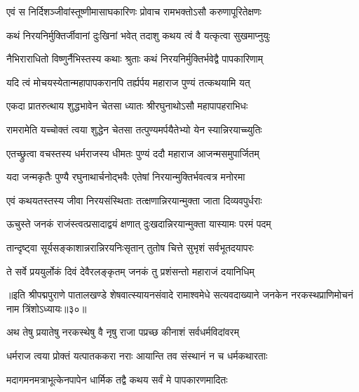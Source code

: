 
\twolineshloka
{एवं स निर्दिशञ्जीवांस्तूष्णीमासाघकारिणः}
{प्रोवाच रामभक्तोऽसौ करुणापूरितेक्षणः}%


\twolineshloka
{कथं निरयनिर्मुक्तिर्जीवानां दुःखिनां भवेत्}
{तदाशु कथय त्वं वै यत्कृत्वा सुखमाप्नुयुः}%


\twolineshloka
{नैभिराराधितो विष्णुर्नैभिस्तस्य कथाः श्रुताः}
{कथं निरयनिर्मुक्तिर्भवेद्वै पापकारिणाम्}%

\twolineshloka
{यदि त्वं मोचयस्येतान्महापापकरानपि}
{तर्ह्यर्पय महाराज पुण्यं तत्कथयामि यत्}%

\twolineshloka
{एकदा प्रातरुत्थाय शुद्धभावेन चेतसा}
{ध्यातः श्रीरघुनाथोऽसौ महापापहराभिधः}%

\twolineshloka
{रामरामेति यच्चोक्तं त्वया शुद्धेन चेतसा}
{तत्पुण्यमर्पयैतेभ्यो येन स्यान्निरयाच्च्युतिः}%


\twolineshloka
{एतच्छ्रुत्वा वचस्तस्य धर्मराजस्य धीमतः}
{पुण्यं ददौ महाराज आजन्मसमुपार्जितम्}%

\twolineshloka
{यदा जन्मकृतैः पुण्यै रघुनाथार्चनोद्भवैः}
{एतेषां निरयान्मुक्तिर्भवत्वत्र मनोरमा}%

\twolineshloka
{एवं कथयतस्तस्य जीवा निरयसंस्थिताः}
{तत्क्षणान्निरयान्मुक्ता जाता दिव्यवपुर्धराः}%

\twolineshloka
{ऊचुस्ते जनकं राजंस्त्वत्प्रसादाद्वयं क्षणात्}
{दुःखदान्निरयान्मुक्ता यास्यामः परमं पदम्}%

\twolineshloka
{तान्दृष्ट्वा सूर्यसङ्काशान्नरान्निरयनिःसृतान्}
{तुतोष चित्ते सुभृशं सर्वभूतदयापरः}%

\twolineshloka
{ते सर्वे प्रययुर्लोकं दिवं देवैरलङ्कृतम्}
{जनकं तु प्रशंसन्तो महाराजं दयानिधिम्}%

॥इति श्रीपद्मपुराणे पातालखण्डे शेषवात्स्यायनसंवादे रामाश्वमेधे सत्यवदाख्याने जनकेन नरकस्थप्राणिमोचनं नाम त्रिंशोऽध्यायः॥३०॥



\twolineshloka
{अथ तेषु प्रयातेषु नरकस्थेषु वै नृषु}
{राजा पप्रच्छ कीनाशं सर्वधर्मविदांवरम्}%


\twolineshloka
{धर्मराज त्वया प्रोक्तं यत्पातककरा नराः}
{आयान्ति तव संस्थानं न च धर्मकथारताः}%

\twolineshloka
{मदागमनमत्राभूत्केनपापेन धार्मिक}
{तद्वै कथय सर्वं मे पापकारणमादितः}%

